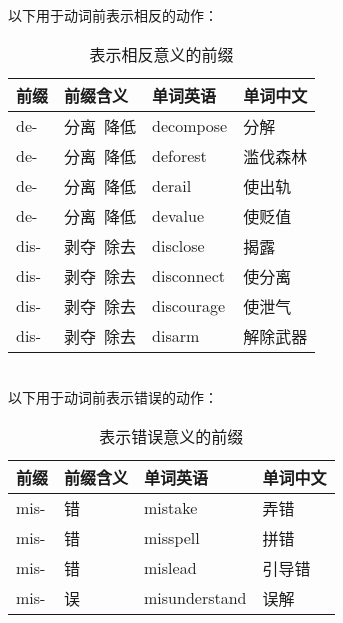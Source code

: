 \documentclass[UTF8]{ctexart}
\begin{document}
    以下用于动词前表示相反的动作：\vspace{5pt}
    \begin{table}[h!]
        \begin{center}
            \ttfamily
            \begin{tabular}{p{40pt}|p{80pt}|p{80pt}|p{80pt}}
                \hline
                前缀&前缀含义&单词英语&单词中文\\ \hline
                de-&分离~降低&decompose&分解\\ \hline
                de-&分离~降低&deforest&滥伐森林\\ \hline
                de-&分离~降低&derail&使出轨\\ \hline
                de-&分离~降低&devalue&使贬值\\ \hline
                dis-&剥夺~除去&disclose&揭露\\ \hline
                dis-&剥夺~除去&disconnect&使分离\\ \hline
                dis-&剥夺~除去&discourage&使泄气\\ \hline
                dis-&剥夺~除去&disarm&解除武器\\ \hline
            \end{tabular}
            \rmfamily
            \caption{表示相反意义的前缀}
        \end{center}
    \end{table}\\
    以下用于动词前表示错误的动作：\vspace{5pt}
    \begin{table}[h!]
        \begin{center}
            \ttfamily
            \begin{tabular}{p{40pt}|p{80pt}|p{80pt}|p{80pt}}
                \hline
                前缀&前缀含义&单词英语&单词中文\\ \hline
                mis-&错&mistake&弄错\\ \hline
                mis-&错&misspell&拼错\\ \hline
                mis-&错&mislead&引导错\\ \hline
                mis-&误&misunderstand&误解\\ \hline
            \end{tabular}
            \rmfamily
            \caption{表示错误意义的前缀}
        \end{center}
    \end{table}\\
\end{document}
